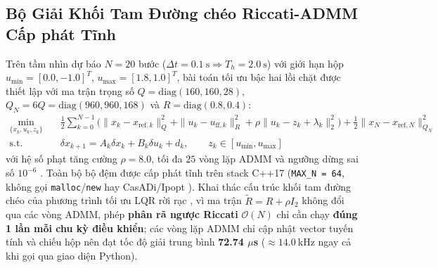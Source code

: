\documentclass[12pt, a4paper]{article}
\begin{document}
\subsection{Bộ Giải Khối Tam Đường chéo Riccati-ADMM Cấp phát Tĩnh}
Trên tầm nhìn dự báo $N = 20$ bước ($\Delta t = 0.1\ \text{s} \Rightarrow T_h = 2.0\ \text{s}$) với giới hạn hộp $u_{\min} = [0.0, -1.0]^T$, $u_{\max} = [1.8, 1.0]^T$, bài toán tối ưu bậc hai lồi chặt được thiết lập với ma trận trọng số $Q = \text{diag}(160, 160, 28)$, $Q_N = 6Q = \text{diag}(960, 960, 168)$ và $R = \text{diag}(0.8, 0.4)$:
\begin{align}
    \min_{\{x_k, u_k, z_k\}} \quad & \frac{1}{2} \sum_{k=0}^{N-1} \Big( \|x_k - x_{\text{ref},k}\|_Q^2 + \|u_k - u_{\text{ff},k}\|_R^2 + \rho \|u_k - z_k + \lambda_k\|_2^2 \Big) + \frac{1}{2} \|x_N - x_{\text{ref},N}\|_{Q_N}^2 \label{eq:riccati_admm} \\
    \text{s.t.} \quad & \delta x_{k+1} = A_k \delta x_k + B_k \delta u_k + d_k, \qquad z_k \in [u_{\min}, u_{\max}] \nonumber
\end{align}
với hệ số phạt tăng cường $\rho = 8.0$, tối đa $25$ vòng lặp ADMM và ngưỡng dừng sai số $10^{-6}$ \cite{boyd2011, odonoghue2013}. Toàn bộ bộ đệm được cấp phát tĩnh trên stack C++17 (\texttt{MAX\_N = 64}, không gọi \texttt{malloc}/\texttt{new} hay CasADi/Ipopt \cite{andersson2019, wachter2006}). Khai thác cấu trúc khối tam đường chéo của phương trình tối ưu LQR rời rạc \cite{kalman1960lqr, rao1998riccati}, vì ma trận $\tilde{R} = R + \rho I_2$ không đổi qua các vòng ADMM, phép \textbf{phân rã ngược Riccati} $\mathcal{O}(N)$ chỉ cần chạy \textbf{đúng 1 lần mỗi chu kỳ điều khiển}; các vòng lặp ADMM chỉ cập nhật vector tuyến tính và chiếu hộp nên đạt tốc độ giải trung bình \textbf{72.74 $\mu$s} ($\approx 14.0\ \text{kHz}$ ngay cả khi gọi qua giao diện Python).
\end{document}

